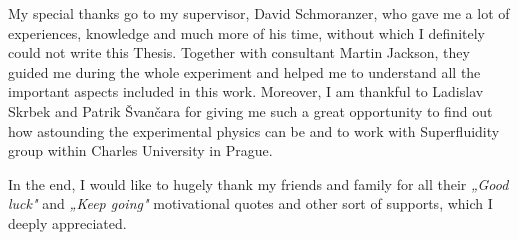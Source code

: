 My special thanks go to my supervisor, David Schmoranzer, who gave me a  lot of experiences, knowledge and much more of his time, without which I definitely could not write this Thesis. Together with consultant Martin Jackson, they guided me during the whole experiment and helped me to understand all the important aspects included in this work. Moreover, I am thankful to Ladislav Skrbek and Patrik Švančara for giving me such a great opportunity to find out how astounding the experimental physics can be and to work with Superfluidity group within Charles University in Prague.

In the end, I would like to hugely thank my friends and family for all their \textit{„Good luck"} and \textit{„Keep going"} motivational quotes and other sort of supports, which I deeply appreciated.